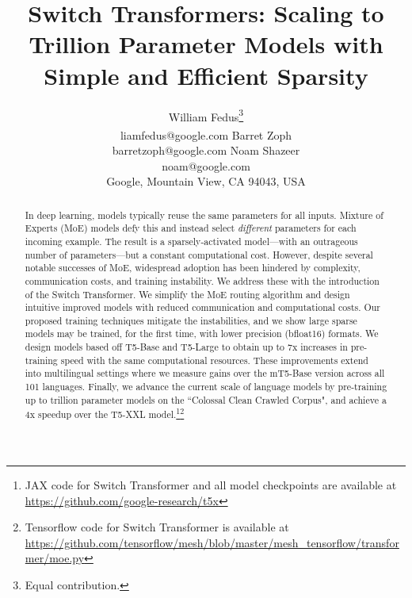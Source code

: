 \documentclass[twoside,11pt]{article}
\makeatletter
\newcommand{\printfnsymbol}[1]{
  \textsuperscript{\@fnsymbol{#1}}
}
\makeatother
\begin{document}
\title{Switch Transformers: Scaling to Trillion Parameter Models with Simple and Efficient Sparsity}

\author{\name William Fedus\thanks{Equal contribution.} \\
\email liamfedus@google.com
\AND    
\name Barret Zoph\printfnsymbol{1} \\
\email barretzoph@google.com
\AND
\name Noam Shazeer \\
\email noam@google.com \\
\addr Google, Mountain View, CA 94043, USA
}


\maketitle

\begin{abstract}
In deep learning, models typically reuse the same parameters for all inputs.
Mixture of Experts (MoE) models defy this and instead select \emph{different} parameters for each incoming example.
The result is a sparsely-activated model---with an outrageous number of parameters---but a constant computational cost.
However, despite several notable successes of MoE, widespread adoption has been hindered by  complexity, communication costs, and training instability.
We address these with the introduction of the Switch Transformer.
We simplify the MoE routing algorithm and design intuitive improved models with reduced communication and computational costs.
Our proposed training techniques mitigate the instabilities, and we show large sparse models may be trained, for the first time, with lower precision (bfloat16) formats.
We design models based off T5-Base and T5-Large \citep{raffel2019exploring} to obtain up to 7x increases in pre-training speed with the same computational resources.
These improvements extend into multilingual settings where we measure gains over the mT5-Base version across all 101 languages.
Finally, we advance the current scale of language models by pre-training up to trillion parameter models on the ``Colossal Clean Crawled Corpus", and achieve a 4x speedup over the T5-XXL model.\footnote{JAX code for Switch Transformer and all model checkpoints are available at \url{https://github.com/google-research/t5x}}\footnote{Tensorflow code for Switch Transformer is available at  \url{https://github.com/tensorflow/mesh/blob/master/mesh_tensorflow/transformer/moe.py}}
\end{abstract}
\end{document}
